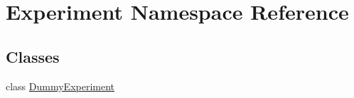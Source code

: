 \hypertarget{namespace_experiment}{}\section{Experiment Namespace Reference}
\label{namespace_experiment}
\subsection*{Classes}
\begin{DoxyCompactItemize}
\item 
class \hyperlink{class_experiment_1_1_dummy_experiment}{Dummy\+Experiment}
\end{DoxyCompactItemize}
